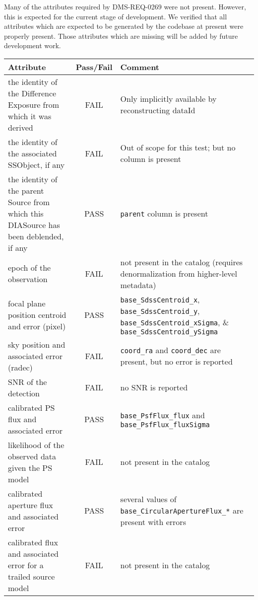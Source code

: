 \documentclass[DM,lsstdraft,STR,toc]{lsstdoc}
\begin{document}
Many of the attributes required by DMS-REQ-0269 were not present. However, this
is expected for the current stage of development. We verified that all
attributes which are expected to be generated by the codebase at present were
properly present. Those attributes which are missing will be added by future
development work.

\begin{table}[h]
    \begin{tabular}{|p{}|c|p{}|}
        \hline
        Attribute & Pass/Fail & Comment \\
        \hline\hline
        the identity of the Difference Exposure from which it was derived & FAIL & Only implicitly available by reconstructing dataId \\
        \hline
        the identity of the associated SSObject, if any & FAIL & Out of scope for this test; but no column is present \\
        \hline
        the identity of the parent Source from which this DIASource has been deblended, if any & PASS & \texttt{parent} column is present \\
        \hline
        epoch of the observation & FAIL & not present in the catalog (requires denormalization from higher-level metadata) \\
        \hline
        focal plane position centroid and error (pixel) & PASS &
        \texttt{base\_SdssCentroid\_x},
        \texttt{base\_SdssCentroid\_y},
        \texttt{base\_SdssCentroid\_xSigma}, \&
        \texttt{base\_SdssCentroid\_ySigma} \\
        \hline
        sky position and associated error (radec) & FAIL & \texttt{coord\_ra} and \texttt{coord\_dec} are present, but no error is reported \\
        \hline
        SNR of the detection & FAIL & no SNR is reported \\
        \hline
        calibrated PS flux and associated error & PASS & \texttt{base\_PsfFlux\_flux} and \texttt{base\_PsfFlux\_fluxSigma} \\
        \hline
        likelihood of the observed data given the PS model & FAIL & not present in the catalog \\
        \hline
        calibrated aperture flux and associated error & PASS & several values of \texttt{base\_CircularApertureFlux\_*} are present with errors \\
        \hline
        calibrated flux and associated error for a trailed source model & FAIL & not present in the catalog \\

\end{tabular}
\end{table}
\end{document}
